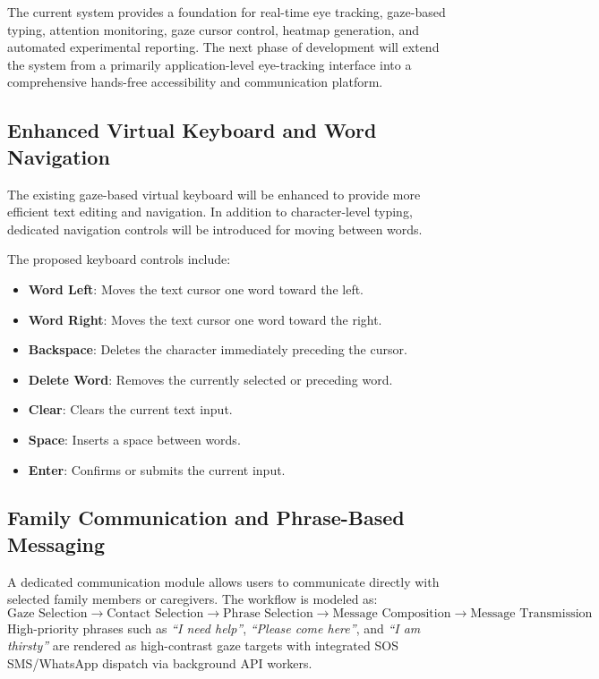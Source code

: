 \documentclass[11pt,a4paper]{article}
\begin{document}
The current system provides a foundation for real-time eye tracking, gaze-based typing, attention monitoring, gaze cursor control, heatmap generation, and automated experimental reporting. The next phase of development will extend the system from a primarily application-level eye-tracking interface into a comprehensive hands-free accessibility and communication platform.

\subsection{Enhanced Virtual Keyboard and Word Navigation}

The existing gaze-based virtual keyboard will be enhanced to provide more efficient text editing and navigation. In addition to character-level typing, dedicated navigation controls will be introduced for moving between words.

The proposed keyboard controls include:
\begin{itemize}
    \item \textbf{Word Left}: Moves the text cursor one word toward the left.
    \item \textbf{Word Right}: Moves the text cursor one word toward the right.
    \item \textbf{Backspace}: Deletes the character immediately preceding the cursor.
    \item \textbf{Delete Word}: Removes the currently selected or preceding word.
    \item \textbf{Clear}: Clears the current text input.
    \item \textbf{Space}: Inserts a space between words.
    \item \textbf{Enter}: Confirms or submits the current input.
\end{itemize}

\subsection{Family Communication and Phrase-Based Messaging}

A dedicated communication module allows users to communicate directly with selected family members or caregivers. The workflow is modeled as:
\begin{equation}
\text{Gaze Selection} \rightarrow \text{Contact Selection} \rightarrow \text{Phrase Selection} \rightarrow \text{Message Composition} \rightarrow \text{Message Transmission}
\end{equation}
High-priority phrases such as \emph{``I need help''}, \emph{``Please come here''}, and \emph{``I am thirsty''} are rendered as high-contrast gaze targets with integrated SOS SMS/WhatsApp dispatch via background API workers.
\end{document}
